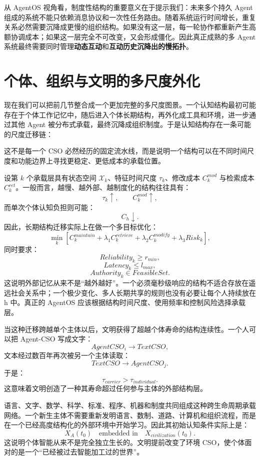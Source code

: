 从 AgentOS 视角看，制度性结构的重要意义在于提示我们：未来多个持久 Agent 组成的系统不能只依赖消息协议和一次性任务路由。随着系统运行时间增长，重复关系必然需要沉降成更慢的组织结构。如果没有这一层，每一轮协作都重新产生高额协调成本；如果这一层完全不可改变，又会形成僵化。因此真正成熟的多 Agent 系统最终需要同时管理\textbf{动态互动}和\textbf{互动历史沉降出的慢拓扑}。

\section{个体、组织与文明的多尺度外化}

现在我们可以把前几节整合成一个更加完整的多尺度图景。一个认知结构最初可能存在于个体工作记忆中，随后进入个体长期结构，再外化成工具和环境，进一步通过其他 Agent 被分布式承载，最终沉降成组织制度。于是认知结构存在一条可能的尺度迁移链：
\begin{statementbox}
\centering
{}
\end{statementbox}
这不是每一个 CSO 必然经历的固定流水线，而是说明一个结构可以在不同时间尺度和功能边界上寻找更稳定、更低成本的承载位置。

设第 $k$ 个承载层具有状态空间 $\mathcal X_k$、特征时间尺度 $\tau_k$、修改成本 $C_k^{mod}$ 与检索成本 $C_k^{ret}$。一般而言，越慢、越外部、越制度化的结构往往具有：
\[
\tau_k\uparrow,
\qquad
C_k^{mod}\uparrow,
\]
而单次个体认知负担则可能：
\[
C_h\downarrow.
\]
因此，长期结构迁移实际上在做一个多目标优化：
\[
\min_{k}
\left[
C_k^{maintain}
+
\lambda_1 C_k^{retrieve}
+
\lambda_2 C_k^{modify}
+
\lambda_3 Risk_k
\right],
\]
同时要求：
\[
Reliability_k\geq r_{min},
\]
\[
Latency_k\leq l_{max},
\]
\[
Authority_k\in FeasibleSet.
\]
这说明外部记忆从来不是``越外越好''。一个必须毫秒级响应的结构不适合存放在遥远社会关系中；一个极少变化、多人长期共享的规则也没有必要让每个人持续放在 h 中。真正的 AgentOS 应该根据结构时间尺度、使用频率和控制风险选择承载层。

当这种迁移跨越单个主体以后，文明获得了超越个体寿命的结构连续性。一个人可以把 Agent-CSO 写成文字：
\[
AgentCSO_i
\rightarrow
TextCSO,
\]
文本经过数百年再次被另一个主体读取：
\[
TextCSO
\rightarrow
AgentCSO_j.
\]
于是：
\[
\tau_{carrier}
>
\tau_{individual}.
\]
这意味着文明创造了一种其寿命超过任何参与主体的外部结构层。

语言、文字、数学、科学、标准、程序、机器和制度共同组成这种跨生命周期承载网络。一个新生主体不需要重新发明语言、数制、道路、计算机和组织流程，而是在一个已经高度结构化的外部环境中开始学习。因此其初始认知条件实际上是：
\[
X_A(t_0)
\quad\text{embedded in}\quad
X_{civilization}(t_0).
\]
这说明个体智能从来不是完全独立生长的。文明提前改变了环境 CSO，使个体面对的是一个``已经被过去智能加工过的世界''。

